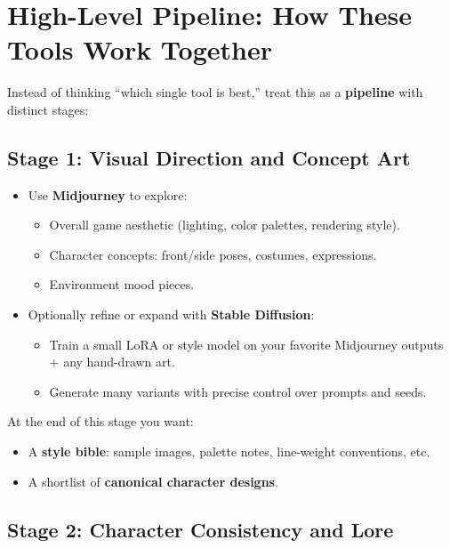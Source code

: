 \documentclass[11pt]{article}
\begin{document}
\section{High-Level Pipeline: How These Tools Work Together}

Instead of thinking ``which single tool is best,'' treat this as a \textbf{pipeline} with distinct stages:

\subsection{Stage 1: Visual Direction and Concept Art}

\begin{itemize}
    \item Use \textbf{Midjourney} to explore:
    \begin{itemize}
        \item Overall game aesthetic (lighting, color palettes, rendering style).
        \item Character concepts: front/side poses, costumes, expressions.
        \item Environment mood pieces.
    \end{itemize}
    \item Optionally refine or expand with \textbf{Stable Diffusion}:
    \begin{itemize}
        \item Train a small LoRA or style model on your favorite Midjourney outputs + any hand-drawn art.
        \item Generate many variants with precise control over prompts and seeds.
    \end{itemize}
\end{itemize}

At the end of this stage you want:
\begin{itemize}
    \item A \textbf{style bible}: sample images, palette notes, line-weight conventions, etc.
    \item A shortlist of \textbf{canonical character designs}.
\end{itemize}

\subsection{Stage 2: Character Consistency and Lore}
\end{document}
